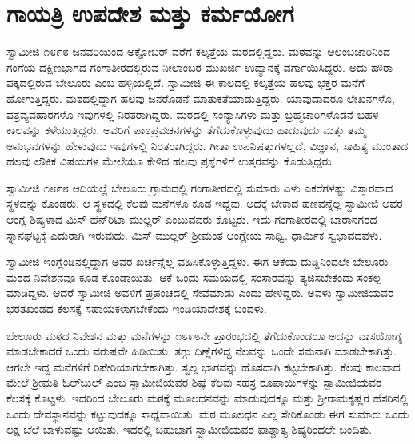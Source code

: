 
\chapter{ಗಾಯತ್ರಿ ಉಪದೇಶ ಮತ್ತು ಕರ್ಮಯೋಗ}

 ಸ್ವಾಮೀಜಿ ೧೮೯೮ ಜನವರಿಯಿಂದ ಅಕ್ಟೋಬರ್ ವರೆಗೆ ಕಲ್ಕತ್ತೆಯ ಮಠದಲ್ಲಿದ್ದರು. ಮಠವನ್ನು ಆಲಂಬಜಾರಿನಿಂದ ಗಂಗೆಯ ದಕ್ಷಿಣಭಾಗದ ಗಂಗಾತೀರದಲ್ಲಿರುವ ನೀಲಾಂಬರ ಮುಖರ್ಜಿ ಉದ್ಯಾನಕ್ಕೆ ವರ್ಗಾಯಿಸಿದ್ದರು. ಅದು ಹೌರಾ ಪಕ್ಕದಲ್ಲಿರುವ ಬೇಲೂರು ಎಂಬ ಹಳ್ಳಿಯಲ್ಲಿದೆ. ಸ್ವಾಮೀಜಿ ಈ ಕಾಲದಲ್ಲಿ ಕಲ್ಕತ್ತೆಯ ಹಲವು ಭಕ್ತರ ಮನೆಗೆ ಹೋಗುತ್ತಿದ್ದರು. ಮಠದಲ್ಲಿದ್ದಾಗ ಹಲವು ಜನರೊಡನೆ ಮಾತುಕತೆಯಾಡುತ್ತಿದ್ದರು. ಯಾವುದಾದರೂ ಲೇಖನಗಳೊ, ಪತ್ರವ್ಯವಹಾರಗಳೊ ಇವುಗಳಲ್ಲಿ ನಿರತರಾಗಿದ್ದರು. ಮಠದಲ್ಲಿ ಸಂನ್ಯಾಸಿಗಳು ಮತ್ತು ಬ್ರಹ್ಮಚಾರಿಗಳೊಡನೆ ಬಹಳ ಕಾಲವನ್ನು ಕಳೆಯುತ್ತಿದ್ದರು. ಅವರಿಗೆ ಪಾಠಪ್ರವಚನಗಳನ್ನು ತೆಗೆದುಕೊಳ್ಳುವುದು ಹಾಡುವುದು ಮತ್ತು ತಮ್ಮ ಅನುಭವಗಳನ್ನು ಹೇಳುವುದು ಇವುಗಳಲ್ಲಿ ನಿರತರಾಗಿದ್ದರು. ಗೀತಾ ಉಪನಿಷತ್ತುಗಳಲ್ಲದೆ, ವಿಜ್ಞಾನ, ಸಾಹಿತ್ಯ ಮುಂತಾದ ಹಲವು ಲೌಕಿಕ ವಿಷಯಗಳ ಮೇಲೆಯೂ ಕೇಳಿದ ಹಲವು ಪ್ರಶ್ನೆಗಳಿಗೆ ಉತ್ತರವನ್ನು ಕೊಡುತ್ತಿದ್ದರು. 

 ಸ್ವಾಮೀಜಿ ೧೮೯೮ ಆದಿಯಲ್ಲೆ ಬೇಲೂರು ಗ್ರಾಮದಲ್ಲಿ ಗಂಗಾತೀರದಲ್ಲಿ ಸುಮಾರು ಏಳು ಎಕರೆಗಳಷ್ಟು ವಿಸ್ತಾರವಾದ ಸ್ಥಳವನ್ನು ಕೊಂಡರು. ಆ ಸ್ಥಳದಲ್ಲಿ ಕೆಲವು ಮನೆಗಳೂ ಕೂಡ ಇದ್ದವು. ಅದಕ್ಕೆ ಬೇಕಾದ ಹಣವನ್ನೆಲ್ಲ ಸ್ವಾಮೀಜಿ ಅವರ ಆಂಗ್ಲ ಶಿಷ್ಯಳಾದ ಮಿಸ್ ಹೆನ್‍ರಿಟಾ ಮುಲ್ಲರ್ ಎಂಬುವವರು ಕೊಟ್ಟರು. ಇದು ಗಂಗಾತೀರದಲ್ಲಿ ಬಾರಾನಗರದ ಸ್ನಾನಘಟ್ಟಕ್ಕೆ ಎದುರಾಗಿ ಇರುವುದು. ಮಿಸ್ ಮುಲ್ಲರ್ ಶ‍್ರೀಮಂತ ಆಂಗ್ಲೇಯ ಸಾಧ್ವಿ. ಧಾರ್ಮಿಕ ಸ್ವಭಾವದವಳು. 

 ಸ್ವಾಮೀಜಿ ಇಂಗ್ಲೆಂಡಿನಲ್ಲಿದ್ದಾಗ ಅವರ ಖರ್ಚನ್ನೆಲ್ಲ ವಹಿಸಿಕೊಳ್ಳುತ್ತಿದ್ದಳು. ಈಗ ಆಕೆಯ ದುಡ್ಡಿನಿಂದಲೇ‌ ಬೇಲೂರು ಮಠದ ನಿವೇಶನವೂ ಕೂಡ ಕೊಂಡಾಯಿತು. ಆಕೆ ಒಂದು ಸಮಯದಲ್ಲಿ ಸಂಸಾರವನ್ನು ತ್ಯಜಿಸಬೇಕೆಂದು ಸಂಕಲ್ಪ ಮಾಡಿದ್ದಳು. ಆದರೆ ಸ್ವಾಮೀಜಿ ಅವಳಿಗೆ ಪ್ರಪಂಚದಲ್ಲಿ ಸೇವೆಮಾಡು ಎಂದು ಹೇಳಿದ್ದರು. ಅವಳು ಸ್ವಾಮೀಜಿಯವರ ಭರತಖಂಡದ ಕೆಲಸಕ್ಕೆ ಸಹಾಯಕಳಾಗಬೇಕೆಂದು ಇಂಡಿಯಾದೇಶಕ್ಕೆ ಬಂದಳು. 

 ಬೇಲೂರು ಮಠದ ನಿವೇಶನ ಮತ್ತು ಮನೆಗಳನ್ನು ೧೮೯೮ನೇ ಪ್ರಾರಂಭದಲ್ಲಿ ತೆಗೆದುಕೊಂಡರೂ ಅದನ್ನು ವಾಸಯೋಗ್ಯ ಮಾಡಬೇಕಾದರೆ ಒಂದು ವರುಷವೇ ಹಿಡಿಯಿತು. ತಗ್ಗು ದಿಣ್ಣೆಗಳಿದ್ದ ನೆಲವನ್ನು ಒಂದೇ ಸಮನಾಗಿ ಮಾಡಬೇಕಾಗಿತ್ತು. ಆಗಲೇ ಇದ್ದ ಮನೆಗಳಿಗೆ ರಿಪೇರಿಯಾಗಬೇಕಾಗಿತ್ತು. ಸ್ವಲ್ಪ ಭಾಗವನ್ನು ಹೊಸದಾಗಿ ಕಟ್ಟಬೇಕಾಗಿತ್ತು. ಕೆಲವು ಕಾಲವಾದ ಮೇಲೆ ಶ‍್ರೀಮತಿ ಓಲ್‍ಬುಲ್ ಎಂಬ ಸ್ವಾಮೀಜಿಯವರ ಶಿಷ್ಯೆ ಕೆಲವು ಸಹಸ್ರ ರೂಪಾಯಿಗಳನ್ನು ಸ್ವಾಮೀಜಿಯವರ ಕೆಲಸಕ್ಕೆ ಕೊಟ್ಟಳು. ಇದರಿಂದ ಬೇಲೂರು ಮಠಕ್ಕೆ ಮೂಲಧನವನ್ನು ಮಾಡುವುದಕ್ಕೂ ಮತ್ತು ಶ‍್ರೀರಾಮಕೃಷ್ಣರ ಹೆಸರಿನಲ್ಲಿ ಒಂದು ದೇವಸ್ಥಾನವನ್ನು ಕಟ್ಟುವುದಕ್ಕೂ ಸಾಧ್ಯವಾಯಿತು. ಮಠ ಮೂಲಧನ ಎಲ್ಲ ಸೇರಿಕೊಂಡು ಈಗ ಸುಮಾರು ಒಂದು ಲಕ್ಷ ಬೆಲೆ ಬಾಳುವಷ್ಟು ಆಯಿತು. ಇದರಲ್ಲಿ ಬಹುಭಾಗ ಸ್ವಾಮೀಜಿಯವರ ಪಾಶ್ಚಾತ್ಯ ಶಿಷ್ಯರಿಂದಲೇ ಬಂದಿತು. 

